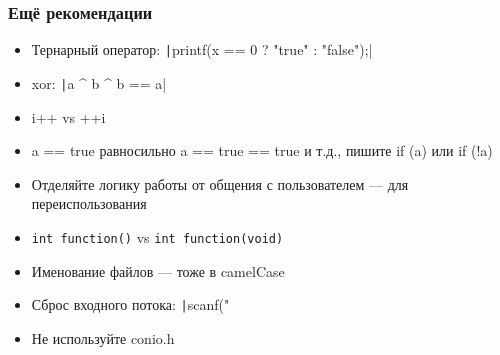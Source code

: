 \documentclass{../../slides-style}
\begin{document}
    \begin{frame}[fragile]
        \frametitle{Ещё рекомендации}
        \begin{itemize}
            \item Тернарный оператор: \texttt|printf(x == 0 ? "true" :  "false");|
            \item xor: \texttt|a ^ b ^ b == a|
            \item i++ vs ++i
            \item a == true равносильно a == true == true и т.д., пишите if (a) или if (!a)
            \item Отделяйте логику работы от общения с пользователем --- для переиспользования
            \item \texttt{int function()} vs \texttt{int function(void)}
            \item Именование файлов --- тоже в camelCase
            \item Сброс входного потока: \texttt|scanf("%
            \item Не используйте conio.h
        \end{itemize}
    \end{frame}
\end{document}
